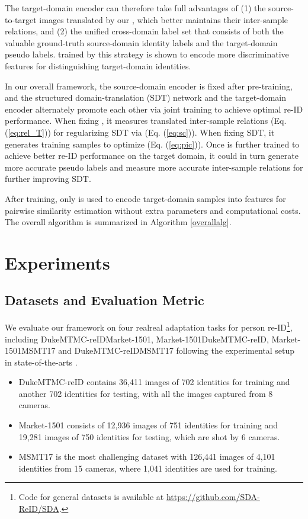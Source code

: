 \documentclass[journal]{IEEEtran}
\begin{document}
The target-domain encoder  can therefore take full advantages of
(1) the source-to-target images translated by our , which better maintains their inter-sample relations, and
(2) the unified cross-domain label set that consists of both the valuable ground-truth source-domain identity labels and the target-domain pseudo labels.
 trained by this strategy is shown to encode more discriminative features for distinguishing target-domain identities.


In our overall framework, the source-domain encoder  is fixed after pre-training, and the structured domain-translation (SDT) network and the target-domain encoder  alternately promote each other via joint training to achieve optimal re-ID performance.
When fixing ,
it measures translated inter-sample relations (Eq. (\ref{eq:rel_T})) for regularizing SDT via
 (Eq. (\ref{eq:sc})).
When fixing SDT, it generates training samples  to optimize  (Eq. (\ref{eq:pic})).
Once  is further trained to achieve better re-ID performance on the target domain, it could in turn generate more accurate pseudo labels and measure more accurate inter-sample relations for further improving SDT.

After training, only  is used to encode target-domain samples into features for pairwise similarity estimation without extra parameters and computational costs.
The overall algorithm is summarized in Algorithm \ref{overallalg}.



\section{Experiments}

\subsection{Datasets and Evaluation Metric}

We evaluate our framework on four realreal adaptation tasks for person re-ID\footnote{Code for general datasets is available at \url{https://github.com/SDA-ReID/SDA}.}, including DukeMTMC-reIDMarket-1501, Market-1501DukeMTMC-reID, Market-1501MSMT17 and DukeMTMC-reIDMSMT17 following the experimental setup in state-of-the-arts \cite{ge2020mutual,yang2019selfsimilarity,zhang2019self}.
\begin{itemize}
\item DukeMTMC-reID \cite{dukemtmc}
contains 36,411 images of 702 identities for training and another 702 identities for testing, with all the images captured from 8 cameras.
\item Market-1501 \cite{market} consists of 12,936 images of 751 identities for training and
19,281 images of 750 identities for testing, which are shot by 6 cameras.
\item MSMT17 \cite{wei2018person} is the most challenging dataset with 126,441 images of 4,101 identities from 15 cameras, where 1,041 identities are used for training.
\end{itemize}
\end{document}
